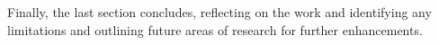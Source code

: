 Finally, the last section concludes, reflecting on the work and identifying any limitations and outlining future areas of research for further enhancements. 


